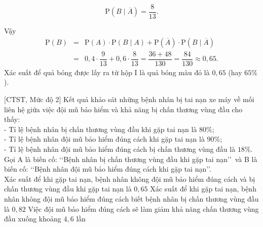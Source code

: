 \begin{bt}
{\begin{itemize}
            \[\mathrm{P}\left(B\mid\overline{A}\right) = \dfrac{8}{13}.\]
        \end{itemize}
        Vậy
        \begin{eqnarray*}
        	\mathrm{P}(B) &=& \mathrm{P}(A) \cdot \mathrm{P}(B\mid A) + \mathrm{P}\left(\overline{A}\right) \cdot \mathrm{P}\left(B\mid\overline{A}\right)\\
        	&=& 0{,}4 \cdot \dfrac{9}{13} + 0{,}6 \cdot \dfrac{8}{13} = \dfrac{36 + 48}{130} = \dfrac{84}{130} \approx 0{,}65.
        \end{eqnarray*}
        Xác suất để quả bóng được lấy ra từ hộp I là quả bóng màu đỏ là $0{,}65$ (hay $65\%$).
    }
\end{bt}

\begin{ex}%
[CTST, Mức độ 2]%
	Kết quả khảo sát những bệnh nhân bị tai nạn xe máy về mối liên hệ giữa việc đội mũ bảo hiểm và khả năng bị chấn thương vùng đầu cho thấy:\\
	- Tỉ lệ bệnh nhân bị chấn thương vùng đầu khi gặp tai nạn là $80 \%$;\\
	- Tỉ lệ bệnh nhân đội mũ bảo hiểm đúng cách khi gặp tai nạn là $90 \%$;\\
	- Tỉ lệ bệnh nhân đội mũ bảo hiểm đúng cách bị chấn thương vùng đầu là $18 \%$.\\
	Gọi A là biến cố: \lq\lq Bệnh nhân bị chấn thương vùng đầu khi gặp tai nạn\rq\rq\, và B là biến cố: \lq\lq Bệnh nhân đội mũ bảo hiểm đúng cách khi gặp tai nạn\rq\rq.\\
	{Xác suất để khi gặp tai nạn, bệnh nhân không đội mũ bảo hiểm đúng cách và bị chấn thương vùng đầu khi gặp tai nạn là $0{,}65$}
	{\True Xác suất để khi gặp tai nạn, bệnh nhân không đội mũ bảo hiểm đúng cách biết bệnh nhân bị chấn thương vùng đầu là $0{,}82$}
	{\True Việc đội mũ bảo hiểm đúng cách sẽ làm giảm khả năng chấn thương vùng đầu xuống khoảng $4{,}6$ lần}
\end{ex}
